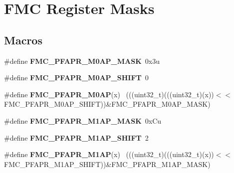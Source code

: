 \hypertarget{group___f_m_c___register___masks}{}\section{F\+M\+C Register Masks}
\label{group___f_m_c___register___masks}
\subsection*{Macros}
\begin{DoxyCompactItemize}
\item 
\hypertarget{group___f_m_c___register___masks_gac1ee4a2aca52fe6f68d05ce0b43dd6b8}{}\#define {\bfseries F\+M\+C\+\_\+\+P\+F\+A\+P\+R\+\_\+\+M0\+A\+P\+\_\+\+M\+A\+S\+K}~0x3u\label{group___f_m_c___register___masks_gac1ee4a2aca52fe6f68d05ce0b43dd6b8}

\item 
\hypertarget{group___f_m_c___register___masks_gaff9b97ca7b6e58fe7aa92c088e2f2fe1}{}\#define {\bfseries F\+M\+C\+\_\+\+P\+F\+A\+P\+R\+\_\+\+M0\+A\+P\+\_\+\+S\+H\+I\+F\+T}~0\label{group___f_m_c___register___masks_gaff9b97ca7b6e58fe7aa92c088e2f2fe1}

\item 
\hypertarget{group___f_m_c___register___masks_ga1c6e41857222a850ea33adcc2d81fa2d}{}\#define {\bfseries F\+M\+C\+\_\+\+P\+F\+A\+P\+R\+\_\+\+M0\+A\+P}(x)                                            ~(((uint32\+\_\+t)(((uint32\+\_\+t)(x))$<$$<$F\+M\+C\+\_\+\+P\+F\+A\+P\+R\+\_\+\+M0\+A\+P\+\_\+\+S\+H\+I\+F\+T))\&F\+M\+C\+\_\+\+P\+F\+A\+P\+R\+\_\+\+M0\+A\+P\+\_\+\+M\+A\+S\+K)\label{group___f_m_c___register___masks_ga1c6e41857222a850ea33adcc2d81fa2d}

\item 
\hypertarget{group___f_m_c___register___masks_ga8b0888db1811509a1b7581445a8a1573}{}\#define {\bfseries F\+M\+C\+\_\+\+P\+F\+A\+P\+R\+\_\+\+M1\+A\+P\+\_\+\+M\+A\+S\+K}~0x\+Cu\label{group___f_m_c___register___masks_ga8b0888db1811509a1b7581445a8a1573}

\item 
\hypertarget{group___f_m_c___register___masks_gac50a9d09140ddfce2457e804b44d2ce5}{}\#define {\bfseries F\+M\+C\+\_\+\+P\+F\+A\+P\+R\+\_\+\+M1\+A\+P\+\_\+\+S\+H\+I\+F\+T}~2\label{group___f_m_c___register___masks_gac50a9d09140ddfce2457e804b44d2ce5}

\item 
\hypertarget{group___f_m_c___register___masks_gafe8518f8050c11ae0bfd9b4740c342cf}{}\#define {\bfseries F\+M\+C\+\_\+\+P\+F\+A\+P\+R\+\_\+\+M1\+A\+P}(x)                                            ~(((uint32\+\_\+t)(((uint32\+\_\+t)(x))$<$$<$F\+M\+C\+\_\+\+P\+F\+A\+P\+R\+\_\+\+M1\+A\+P\+\_\+\+S\+H\+I\+F\+T))\&F\+M\+C\+\_\+\+P\+F\+A\+P\+R\+\_\+\+M1\+A\+P\+\_\+\+M\+A\+S\+K)\label{group___f_m_c___register___masks_gafe8518f8050c11ae0bfd9b4740c342cf}


\end{DoxyCompactItemize}
